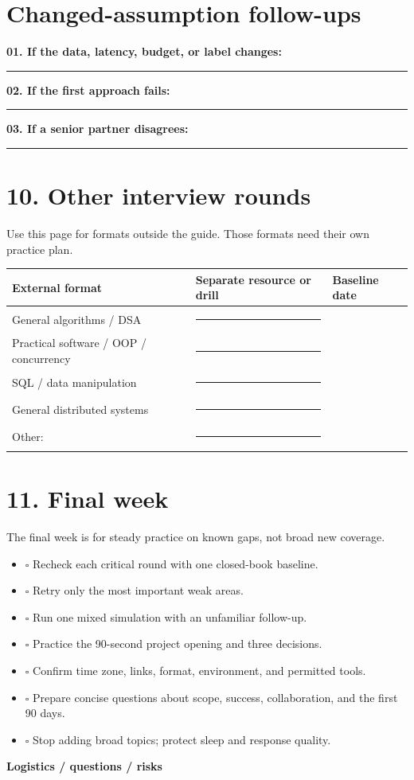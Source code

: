 \documentclass[10pt,letterpaper]{article}
\newcommand{\longline}{\par\noindent\rule{\linewidth}{.35pt}\par\vspace{.35em}}
\newcommand{\boxline}[1]{\par\noindent\fcolorbox{rule}{wash}{\parbox[t][#1][t]{\dimexpr\linewidth-2\fboxsep-2\fboxrule\relax}{\rule{\linewidth}{0pt}}}\par}
\begin{document}
\section*{Changed-assumption follow-ups}
\textbf{01. If the data, latency, budget, or label changes:}\par
\longline
\textbf{02. If the first approach fails:}\par
\longline
\textbf{03. If a senior partner disagrees:}\par
\longline

\newpage
\section*{10. Other interview rounds}
Use this page for formats outside the guide. Those formats need their own practice plan.
\vspace{.1in}
\begin{tabularx}{\linewidth}{@{}p{.29\linewidth} X p{.18\linewidth}@{}}
\toprule
External format & Separate resource or drill & Baseline date \\
\midrule
General algorithms / DSA & \rule{.62\hsize}{.35pt} & \\
Practical software / OOP / concurrency & \rule{.62\hsize}{.35pt} & \\
SQL / data manipulation & \rule{.62\hsize}{.35pt} & \\
General distributed systems & \rule{.62\hsize}{.35pt} & \\
Other: & \rule{.62\hsize}{.35pt} & \\
\bottomrule
\end{tabularx}

\section*{11. Final week}
The final week is for steady practice on known gaps, not broad new coverage.
\begin{itemize}
  \item $\square$ Recheck each critical round with one closed-book baseline.
  \item $\square$ Retry only the most important weak areas.
  \item $\square$ Run one mixed simulation with an unfamiliar follow-up.
  \item $\square$ Practice the 90-second project opening and three decisions.
  \item $\square$ Confirm time zone, links, format, environment, and permitted tools.
  \item $\square$ Prepare concise questions about scope, success, collaboration, and the first 90 days.
  \item $\square$ Stop adding broad topics; protect sleep and response quality.
\end{itemize}
\textbf{Logistics / questions / risks}\par
\boxline{1.35in}
\end{document}
